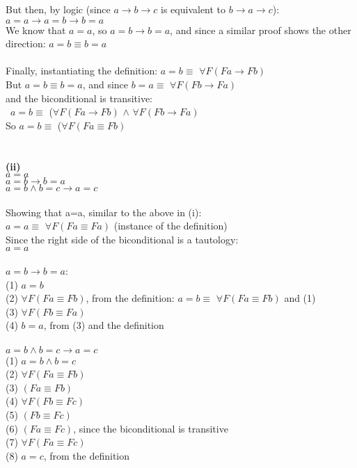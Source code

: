 \documentclass{article}
\begin{document}
But then, by logic (since $a \rightarrow b \rightarrow c$ is equivalent to $b \rightarrow a \rightarrow c$):\\
$a=a \rightarrow a=b \rightarrow b=a$\\
We know that $a=a$, so $a=b \rightarrow b=a$, and since a similar proof shows the other direction: $a=b \equiv b=a$\\\\
Finally, instantiating the definition:
$a = b \equiv$ $\forall F (Fa \rightarrow Fb)$\\
But $a=b \equiv b=a$, and since  $b = a \equiv$ $\forall F (Fb \rightarrow Fa)$\\ and the biconditional is transitive:\\\
$a = b \equiv$ ($\forall F (Fa \rightarrow Fb)$ $\wedge$ $\forall F (Fb \rightarrow Fa)$\\
So $a = b \equiv$ ($\forall F (Fa \equiv Fb)$\\\\
\\\textbf{(ii)}\\
$a=a$\\
$a=b \rightarrow b=a$\\
$a=b \wedge b=c \rightarrow a=c$\\\\
Showing that a=a, similar to the above in (i):\\
$a = a \equiv$ $\forall F (Fa \equiv Fa)$ (instance of the definition)\\
Since the right side of the biconditional is a tautology:\\
$a = a$ \\\\
$a=b \rightarrow b=a$:\\
(1) $a=b$\\	
(2) $\forall F (Fa \equiv Fb)$, from the definition: $a = b \equiv$ $\forall F (Fa \equiv Fb)$ and (1) \\
(3) $\forall F (Fb \equiv Fa)$\\
(4) $b=a$, from (3) and the definition\\\\
$a=b \wedge b=c \rightarrow a=c$\\
(1) $a=b \wedge b=c$\\
(2) $\forall F (Fa \equiv Fb)$\\
(3) $(Fa \equiv Fb)$\\
(4) $\forall F (Fb \equiv Fc)$\\
(5) $(Fb \equiv Fc)$\\
(6) $(Fa \equiv Fc)$, since the biconditional is transitive\\
(7) $\forall F (Fa \equiv Fc)$\\
(8) $a=c$, from the definition\\
\end{document}
